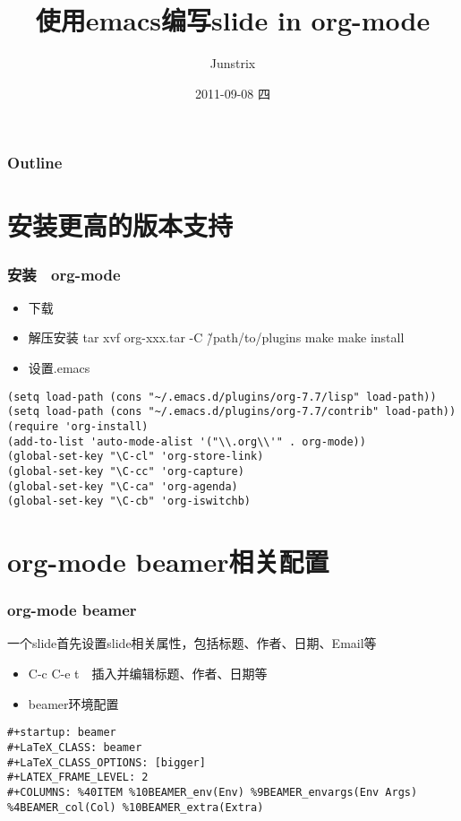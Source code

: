 \documentclass[bigger]{beamer}
\title{使用emacs编写slide in org-mode}
\author{Junstrix}
\date{2011-09-08 四}
\begin{document}
\maketitle

\begin{frame}
\frametitle{Outline}
\setcounter{tocdepth}{3}
\tableofcontents
\end{frame}


\section{安装更高的版本支持}
\label{sec-1}
\begin{frame}[fragile]
\frametitle{安装　org-mode}
\label{sec-1-1}

\begin{itemize}
\item 下载
\item 解压安装
     tar xvf org-xxx.tar -C \~/path/to/plugins
     make 
     make install
\item 设置.emacs
\end{itemize}

\begin{verbatim}
(setq load-path (cons "~/.emacs.d/plugins/org-7.7/lisp" load-path))
(setq load-path (cons "~/.emacs.d/plugins/org-7.7/contrib" load-path))
(require 'org-install)
(add-to-list 'auto-mode-alist '("\\.org\\'" . org-mode))
(global-set-key "\C-cl" 'org-store-link)
(global-set-key "\C-cc" 'org-capture)
(global-set-key "\C-ca" 'org-agenda)
(global-set-key "\C-cb" 'org-iswitchb)
\end{verbatim}
\end{frame}
\section{org-mode beamer相关配置}
\label{sec-2}
\begin{frame}[fragile]
\frametitle{org-mode beamer}
\label{sec-2-1}

一个slide首先设置slide相关属性，包括标题、作者、日期、Email等
\begin{itemize}
\item C-c C-e t　插入并编辑标题、作者、日期等
\item beamer环境配置
\end{itemize}

\begin{verbatim}
#+startup: beamer
#+LaTeX_CLASS: beamer
#+LaTeX_CLASS_OPTIONS: [bigger]
#+LATEX_FRAME_LEVEL: 2
#+COLUMNS: %40ITEM %10BEAMER_env(Env) %9BEAMER_envargs(Env Args)
%4BEAMER_col(Col) %10BEAMER_extra(Extra)
\end{verbatim}
\end{frame}
\end{document}
